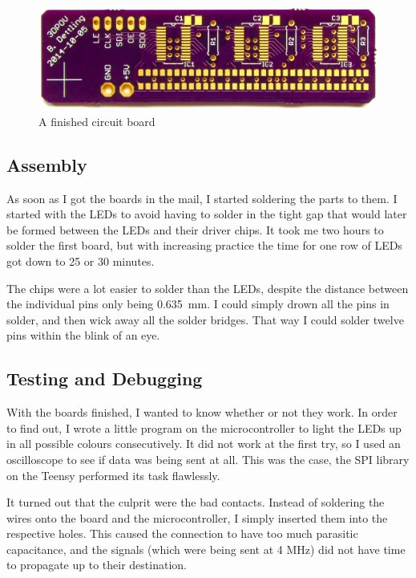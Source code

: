 \documentclass[a4paper, 11pt, titlepage]{report}
\begin{document}
\begin{figure}[h]
\vspace{3mm}
\includegraphics[width=\textwidth]{./images/board-finished.jpeg}
\vspace{-8mm}
\caption{A finished circuit board}
\end{figure}


\subsection{Assembly}

As soon as I got the boards in the mail, I started soldering the parts to them. I started with the
LEDs to avoid having to solder in the tight gap that would later be formed between the LEDs and
their driver chips. It took me two hours to solder the first board, but with increasing practice
the time for one row of LEDs got down to 25 or 30 minutes.

The chips were a lot easier to solder than the LEDs, despite the distance between the individual
pins only being \SI{0.635}{\milli\meter}. I could simply drown all the pins in solder, and then
wick away all the solder bridges. That way I could solder twelve pins within the blink of an eye.




\subsection {Testing and Debugging}

With the boards finished, I wanted to know whether or not they work. In order to find out, I wrote
a little program on the microcontroller to light the LEDs up in all possible colours consecutively.
It did not work at the first try, so I used an oscilloscope to see if data was being sent at all.
This was the case, the SPI library on the Teensy performed its task flawlessly.

It turned out that the culprit were the bad contacts. Instead of soldering the wires onto the board
and the microcontroller, I simply inserted them into the respective holes. This caused the
connection to have too much parasitic capacitance, and the signals (which were being sent at 4 MHz)
did not have time to propagate up to their destination.
\end{document}
